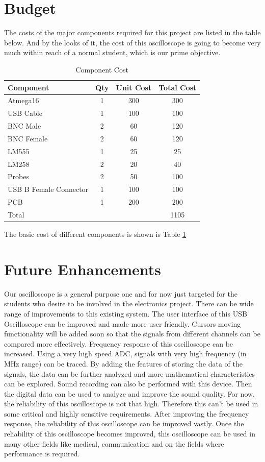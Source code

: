 \documentclass[12pt,a4paper]{article}
\begin{document}
\section{Budget}
The costs of the major components required for this project are listed in the table below. And by the looks of it, the cost of this oscilloscope is going to become very much within reach of a normal student, which is our prime objective. 
\begin{table}[h]
	\centering
	\begin{tabular}{|l|c|c|c|}
	\hline 
	\textbf{Component} & \textbf{Qty} & \textbf{Unit Cost} & T\textbf{otal Cost} \\ 
	\hline 
	Atmega16 & 1 & 300 & 300 \\ 
	USB Cable & 1 & 100 & 100 \\ 
	BNC Male & 2 & 60 & 120 \\ 
	BNC Female & 2 & 60 & 120 \\ 
	LM555 & 1 & 25 & 25 \\ 
	LM258 & 2 & 20 & 40 \\ 
	Probes & 2 & 50 & 100 \\ 
		
	USB B Female Connector & 1 & 100 & 100 \\ 
	
	PCB & 1 & 200 & 200 \\ 
	\hline 
	Total & {} & {} & 1105 \\ 
	\hline 
	\end{tabular} 
	\caption{Component Cost}
	\label{tab:CostAnalysis}
\end{table}
The basic cost of different components is shown is Table \ref{tab:CostAnalysis}
\section{Future Enhancements}
Our oscilloscope is a general purpose one and for now just targeted for the students who desire to be involved in the electronics project. There can be wide range of improvements to this existing system.  
The user interface of this USB Oscilloscope can be improved and made more user friendly. Cursors moving functionality will be added soon so that the signals from different channels can be compared more effectively.
Frequency response of this oscilloscope can be increased. Using a very high speed ADC, signals with very high frequency (in MHz range) can be traced.
By adding the features of storing the data of the signals, the data can be further analyzed and more mathematical characteristics can be explored. 
Sound recording can also be performed with this device. Then the digital data can be used to analyze and improve the sound quality.
For now, the reliability of this oscilloscope is not that high. Therefore this can’t be used in some critical and highly sensitive requirements. After improving the frequency response, the reliability of this oscilloscope can be improved vastly. Once the reliability of this oscilloscope becomes improved, this oscilloscope can be used in many other fields like medical, communication  and on the fields where performance is required.  
\end{document}
